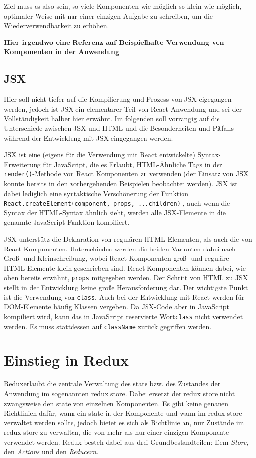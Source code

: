 Ziel muss es also sein, so viele Komponenten wie möglich so klein wie möglich, optimaler Weise mit nur einer einzigen Aufgabe zu schreiben, um die Wiederverwendbarkeit zu erhöhen.

\textbf{Hier irgendwo eine Referenz auf Beispielhafte Verwendung von Komponenten in der Anwendung}

\subsection{JSX}
Hier soll nicht tiefer auf die Kompilierung und Prozess von JSX eigegangen werden, jedoch ist JSX ein elementarer Teil von React-Anwendung und sei der Vollständigkeit halber hier erwähnt. Im folgenden soll vorrangig auf die Unterschiede zwischen JSX und HTML und die Besonderheiten und Pitfalls während der Entwicklung mit JSX eingegangen werden.

JSX ist eine (eigens für die Verwendung mit React entwickelte) Syntax-Erweiterung für JavaScript, die es Erlaubt, HTML-Ähnliche Tags in der \verb|render()|-Methode von React Komponenten zu verwenden (der Einsatz von JSX konnte bereits in den vorhergehenden Beispielen beobachtet werden).
JSX ist dabei lediglich eine syntaktische Verschönerung der Funktion \verb|React.createElement(component, props, ...children)| \cite{ReactJSX}, auch wenn die Syntax der HTML-Syntax ähnlich sieht, werden alle JSX-Elemente in die genannte JavaScript-Funktion kompiliert.

JSX unterstütz die Deklaration von regulären HTML-Elementen, als auch die von React-Komponenten. Unterschieden werden die beiden Varianten dabei nach Groß- und Kleinschreibung, wobei React-Komponenten groß- und reguläre HTML-Elemente klein geschrieben sind.
React-Komponenten können dabei, wie oben bereits erwähnt, \verb|props| mitgegeben werden.
Der Schritt von HTML zu JSX stellt in der Entwicklung keine große Herausforderung dar.
Der wichtigste Punkt ist die Verwendung von \verb|class|. Auch bei der Entwicklung mit React werden für DOM-Elemente häufig Klassen vergeben. Da JSX-Code aber in JavaScript kompiliert wird, kann das in JavaScript reservierte Wort\footnotemark \verb|class|  nicht verwendet werden. Es muss stattdessen auf \verb|className| zurück gegriffen werden.



\section{Einstieg in Redux}
Redux\footnotemark  erlaubt die zentrale Verwaltung des state bzw. des Zustandes der Anwendung im sogenannten redux store. Dabei ersetzt der redux store nicht zwangsweise den state von einzelnen Komponenten. Es gibt keine genauen Richtlinien dafür, wann ein state in der Komponente und wann im redux store verwaltet werden sollte, jedoch bietet es sich als Richtlinie an, nur Zustände im redux store zu verwalten, die von mehr als nur einer einzigen Komponente verwendet werden.
Redux besteh dabei aus drei Grundbestandteilen: Dem \textit{Store}, den \textit{Actions} und den \textit{Reducern}.

